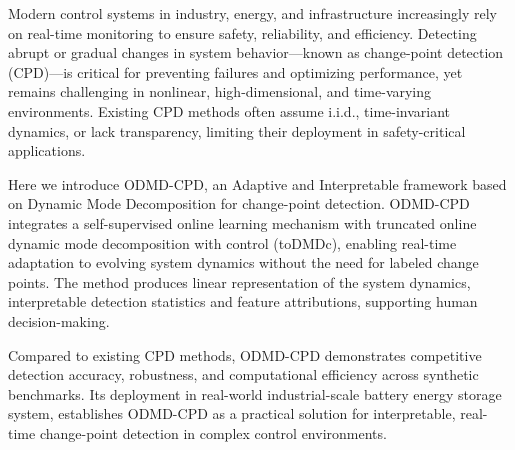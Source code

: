 Modern control systems in industry, energy, and infrastructure increasingly rely on real-time monitoring to ensure safety, reliability, and efficiency. Detecting abrupt or gradual changes in system behavior—known as change-point detection (CPD)—is critical for preventing failures and optimizing performance, yet remains challenging in nonlinear, high-dimensional, and time-varying environments. Existing CPD methods often assume i.i.d.,  time-invariant dynamics, or lack transparency, limiting their deployment in safety-critical applications.

Here we introduce ODMD-CPD, an Adaptive and Interpretable framework based on Dynamic Mode Decomposition for change-point detection. ODMD-CPD integrates a self-supervised online learning mechanism with truncated online dynamic mode decomposition with control (toDMDc), enabling real-time adaptation to evolving system dynamics without the need for labeled change points. The method produces linear representation of the system dynamics, interpretable detection statistics and feature attributions, supporting human decision-making.

Compared to existing CPD methods, ODMD-CPD demonstrates competitive detection accuracy, robustness, and computational efficiency across synthetic benchmarks. Its deployment in real-world industrial-scale battery energy storage system, establishes ODMD-CPD as a practical solution for interpretable, real-time change-point detection in complex control environments.
